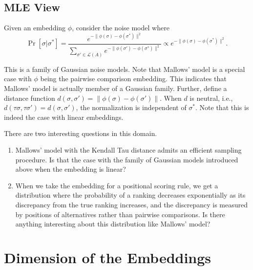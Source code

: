 \documentclass[10pt,letterpaper]{article}
\newcommand{\calL}{{\mathcal{L}}}
\newcommand{\rank}{{\calL(A)}}
\begin{document}

\subsection{MLE View}
Given an embedding $\phi$, consider the noise model where 
$$
\Pr[\sigma | \sigma^*] = \frac{e^{-\|\phi(\sigma)-\phi(\sigma^*)\|^2}}{\sum_{\sigma' \in \rank} e^{-\|\phi(\sigma')-\phi(\sigma^*)\|^2}} \propto e^{-\|\phi(\sigma)-\phi(\sigma^*)\|^2}.
$$

This is a family of Gaussian noise models. Note that Mallows' model is a special case with $\phi$ being the pairwise comparison embedding. This indicates that Mallows' model is actually member of a Gaussian family. Further, define a distance function $d(\sigma,\sigma') = \|\phi(\sigma)-\phi(\sigma')\|$. When $d$ is neutral, i.e., $d(\tau \sigma,\tau \sigma') = d(\sigma,\sigma')$, the normalization is independent of $\sigma^*$. Note that this is indeed the case with linear embeddings. 

There are two interesting questions in this domain.
\begin{enumerate}
\item Mallows' model with the Kendall Tau distance admits an efficient sampling procedure. Is that the case with the family of Gaussian models introduced above when the embedding is linear? 
\item When we take the embedding for a positional scoring rule, we get a distribution where the probability of a ranking decreases exponentially as its discrepancy from the true ranking increases, and the discrepancy is measured by positions of alternatives rather than pairwise comparisons. Is there anything interesting about this distribution like Mallows' model?
\end{enumerate}


\section{Dimension of the Embeddings}
\end{document}

